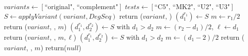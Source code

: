 \documentclass[11pt]{article}
\begin{document}
  




\begin{algorithm}[H]
\caption{{\tt DetermineNonSplitType}($\mathit{DegSeq}$)}
\begin{algorithmic}[1]
	\STATE $\mathit{variants} \leftarrow [\text{``original",  ``complement"}]$
     	\STATE $\mathit{tests} \leftarrow  [\text{``C5", ``MK2", ``U2", ``U3"}]$
      		\STATE $S  \leftarrow {applyVariant}(variant, \mathit{DegSeq})$\;
		   	\STATE return ($variant$,  )
		    \ENDIF
		         \STATE $(d_1^{r_1}) \leftarrow \mathit{S}$
		           \STATE $\mathit{m} \leftarrow r_1 / 2$
		               \STATE return ($variant$,  , $m$)
		            \ENDIF
		          \ENDIF
		       \ENDIF       
		        \STATE $(d_1^{r_1}, d_2^{r_2}) \leftarrow \mathit{S}$ with $d_1 > d_2$
		           \STATE $m \leftarrow (r_2 - d_1) / 2$, $\ell \leftarrow d_1$
		              \STATE return ($variant$,  , $m, \ell$)
		            \ENDIF
		         \ENDIF
		       \ENDIF
		         \STATE $(d_1^{r_1}, d_2^{r_2}) \leftarrow \mathit{S}$ with $d_1 > d_2$
		            \STATE $\mathit{m} \leftarrow (d_1 - 2) / 2$
		                \STATE return ($variant$,  , $m$)
		             \ENDIF
		          \ENDIF
		        \ENDIF
		\ENDFOR
	\ENDFOR
        \STATE return($null$)
\end{algorithmic}
\end{algorithm}
\end{document}
